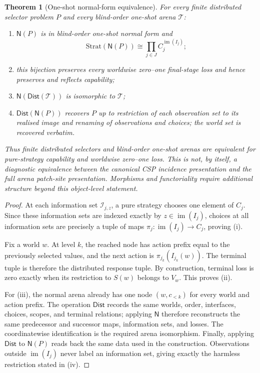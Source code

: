 \documentclass[11pt]{article}
\theoremstyle{plain}
\newtheorem{theorem}{Theorem}[section]
\theoremstyle{definition}
\theoremstyle{remark}
\newcommand{\im}{\operatorname{im}}
\begin{document}
\begin{theorem}[One-shot normal-form equivalence]
\label{thm:one-shot-normal-form}
For every finite distributed selector problem $P$ and every blind-order
one-shot arena $\mathcal T$:
\begin{enumerate}[label=(\roman*)]
\item $\mathsf N(P)$ is in blind-order one-shot normal form and
\[
\mathrm{Strat}(\mathsf N(P))
\cong\prod_{j\in J}C_j^{\im(I_j)};
\]
\item this bijection preserves every worldwise zero--one final-stage loss and hence
preserves and reflects capability;
\item $\mathsf N(\mathsf{Dist}(\mathcal T))$ is isomorphic to $\mathcal T$;
\item $\mathsf{Dist}(\mathsf N(P))$ recovers $P$ up to restriction of each
observation set to its realised image and renaming of observations and choices; the world set is recovered verbatim.
\end{enumerate}
Thus finite distributed selectors and blind-order one-shot arenas are equivalent
for pure-strategy capability and worldwise zero--one loss. This is not, by
itself, a diagnostic equivalence between the canonical CSP incidence
presentation and the full arena patch-site presentation. Morphisms and
functoriality require additional structure beyond this object-level statement.
\end{theorem}

\begin{proof}
At each information set $\mathcal I_{j,z}$, a pure strategy chooses one element
of $C_j$. Since these information sets are indexed exactly by
$z\in\im(I_j)$, choices at all information sets are precisely a tuple of maps
$\pi_j:\im(I_j)\to C_j$, proving (i).

Fix a world $w$. At level $k$, the reached node has action prefix equal to the
previously selected values, and the next action is
$\pi_{j_k}(I_{j_k}(w))$. The terminal tuple is therefore the distributed
response tuple. By construction, terminal loss is zero exactly when its
restriction to $S(w)$ belongs to $V_w$. This proves (ii).

For (iii), the normal arena already has one node $(w,c_{<k})$ for every world
and action prefix. The operation $\mathsf{Dist}$ records the same worlds, order,
interfaces, choices, scopes, and terminal relations; applying $\mathsf N$
therefore reconstructs the same predecessor and successor maps, information
sets, and losses. The coordinatewise identification is the required arena
isomorphism. Finally, applying $\mathsf{Dist}$ to $\mathsf N(P)$ reads back the
same data used in the construction. Observations outside $\im(I_j)$ never label
an information set, giving exactly the harmless restriction stated in (iv).
\end{proof}
\end{document}
